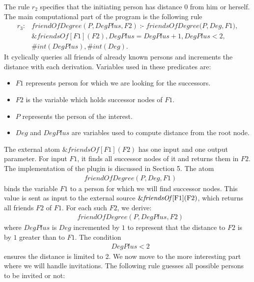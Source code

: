 \documentclass[14pt,a4paper, titlepage]{article}
\newcommand{\ext}[3]{\ensuremath{\&{#1}[#2](#3)}}
\DeclareMathOperator{\leftimpl}{:-}
\begin{document}
The rule $r_2$ specifies that the initiating person has distance 0 from him or herself. The main computational part of the program is the following rule   
\begin{align*}
r_{3}\colon& \mathit{friendOfDegree}(\mathit{P, DegPlus, F2}) \leftimpl \mathit{friendsOfDegree}(\mathit{P,Deg,F1)},\\
& \ext{friendsOf}{F1}{F2}, \mathit{DegPlus = DegPlus + 1}, \mathit{DegPlus < 2},\\
& \mathit{\#int(DegPlus)}, \mathit{\#int(Deg)}.
\end{align*} 
It cyclically queries all  friends of already known persons and increments the distance with each derivation. Variables used in these predicates are: 

\begin{itemize}
\item $\mathit{F1}$ represents person for which we are looking for the successors.

\item $\mathit{F2}$ is the variable which holds successor nodes of $F1$. 

\item $P$ represents the person of the interest.

\item $\mathit{Deg}$ and $DegPlus$ are variables used to compute distance from the root node.
\end{itemize}
The external atom \ext{friendsOf}{F1}{F2} has one input and one output parameter. For input $\mathit{F1}$, 
it finds all successor nodes of it and returns them in $\mathit{F2}$. The implementation of the plugin is discussed in Section 5. The atom
\begin{align*}
& \mathit{friendOfDegree(P, Deg, F1)}
\end{align*}
binds the variable $\mathit{F1}$ to a person for which we will find successor nodes. This value is sent as input to the external source \ext{\mathit{friendsOf}}{$F1$}{$F2$}, which returns all friends $F2$ of $F1$. For each such $F2$, we derive:
\begin{align*}
& \mathit{friendOfDegree(P, DegPlus, F2)}
\end{align*} 
where $\mathit{DegPlus}$ is $\mathit{Deg}$ incremented by $1$ to represent that the distance to $F2$ is by $1$ greater than to $F1$. The condition
\begin{align*}
& \mathit{DegPlus < 2}
\end{align*}
ensures the distance is limited to 2. We now move to the more interesting part where we will handle invitations. The following rule guesses all possible persons to be invited or not:
\end{document}

